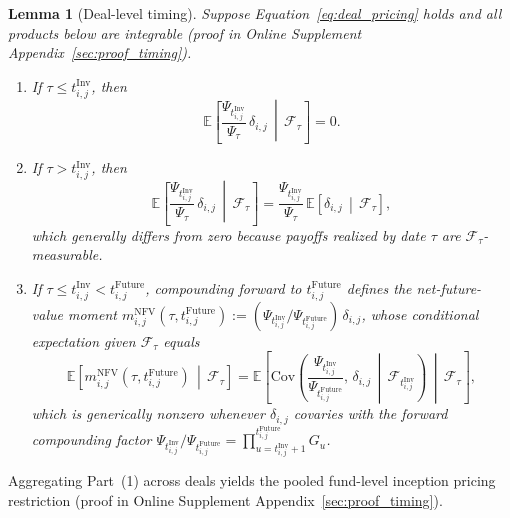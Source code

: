 \documentclass[12pt]{article}
\newtheorem{lemma}{Lemma}
\begin{document}
\begin{lemma}[Deal-level timing]
\label{lem:deal_level_timing}
Suppose Equation~\eqref{eq:deal_pricing} holds and all products below are integrable (proof in Online Supplement Appendix~\ref{sec:proof_timing}).
\begin{enumerate}
  \item If $\tau \le t_{i,j}^{\mathrm{Inv}}$, then
  \begin{equation}
  \label{eq:zero_deal_expectation}
  \mathbb{E}\!\left[\frac{\Psi_{t_{i,j}^{\mathrm{Inv}}}}{\Psi_\tau}\,\delta_{i,j} \,\middle|\, \mathcal{F}_\tau\right] = 0.
  \end{equation}
  \item If $\tau > t_{i,j}^{\mathrm{Inv}}$, then
  \begin{equation}
  \label{eq:non_zero_deal_expectation}
  \mathbb{E}\!\left[\frac{\Psi_{t_{i,j}^{\mathrm{Inv}}}}{\Psi_\tau}\,\delta_{i,j} \,\middle|\, \mathcal{F}_\tau\right]
  = \frac{\Psi_{t_{i,j}^{\mathrm{Inv}}}}{\Psi_\tau}\,\mathbb{E}\!\left[\delta_{i,j} \,\middle|\, \mathcal{F}_\tau\right],
  \end{equation}
  which generally differs from zero because payoffs realized by date $\tau$ are $\mathcal{F}_\tau$-measurable.
  \item If $\tau \le t_{i,j}^{\mathrm{Inv}} < t_{i,j}^{\mathrm{Future}}$, compounding forward to $t_{i,j}^{\mathrm{Future}}$ defines the net-future-value moment $m_{i,j}^{\mathrm{NFV}}(\tau,t_{i,j}^{\mathrm{Future}}) := (\Psi_{t_{i,j}^{\mathrm{Inv}}}/\Psi_{t_{i,j}^{\mathrm{Future}}})\,\delta_{i,j}$, whose conditional expectation given $\mathcal{F}_\tau$ equals
  \begin{equation}
  \label{eq:future_value_bias_derivation}
  \mathbb{E}\!\left[m_{i,j}^{\mathrm{NFV}}\!\left(\tau,t_{i,j}^{\mathrm{Future}}\right) \,\middle|\, \mathcal{F}_\tau\right]
  = \mathbb{E}\!\left[\mathrm{Cov}\!\left(\frac{\Psi_{t_{i,j}^{\mathrm{Inv}}}}{\Psi_{t_{i,j}^{\mathrm{Future}}}},\,\delta_{i,j} \,\middle|\, \mathcal{F}_{t_{i,j}^{\mathrm{Inv}}}\right) \,\middle|\, \mathcal{F}_\tau\right],
  \end{equation}
  which is generically nonzero whenever $\delta_{i,j}$ covaries with the forward compounding factor $\Psi_{t_{i,j}^{\mathrm{Inv}}}/\Psi_{t_{i,j}^{\mathrm{Future}}} = \prod_{u=t_{i,j}^{\mathrm{Inv}}+1}^{t_{i,j}^{\mathrm{Future}}} G_u$.
\end{enumerate}
\end{lemma}

Aggregating Part~(1) across deals yields the pooled fund-level inception pricing restriction (proof in Online Supplement Appendix~\ref{sec:proof_timing}).
\end{document}
